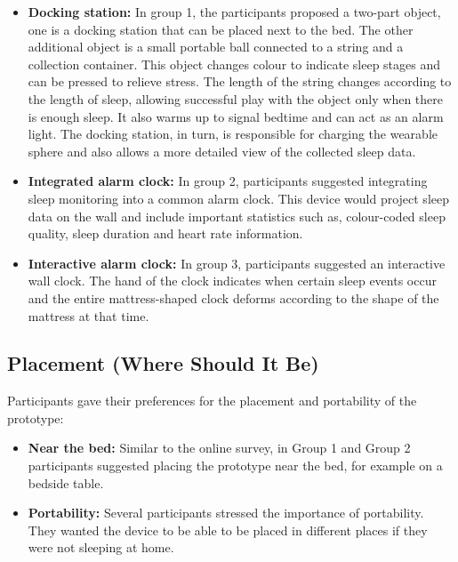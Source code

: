 \documentclass[
  a4paper,  %
  twoside,  %
  bibliography=totoc,
  headsepline,
  cleardoublepage=empty,
  parskip=half,
  draft=false
]{scrbook}
\begin{document}
\begin{itemize}
    \item \textbf{Docking station:} In group 1, the participants proposed a two-part object, one is a docking station that can be placed next to the bed. The other additional object is a small portable ball connected to a string and a collection container. This object changes colour to indicate sleep stages and can be pressed to relieve stress. The length of the string changes according to the length of sleep, allowing successful play with the object only when there is enough sleep. It also warms up to signal bedtime and can act as an alarm light. The docking station, in turn, is responsible for charging the wearable sphere and also allows a more detailed view of the collected sleep data.
    \item \textbf{Integrated alarm clock:} In group 2, participants suggested integrating sleep monitoring into a common alarm clock. This device would project sleep data on the wall and include important statistics such as, colour-coded sleep quality, sleep duration and heart rate information. 
    \item \textbf{Interactive alarm clock:} In group 3, participants suggested an interactive wall clock. The hand of the clock indicates when certain sleep events occur and the entire mattress-shaped clock deforms according to the shape of the mattress at that time.
\end{itemize}

\subsection{Placement (Where Should It Be)}
Participants gave their preferences for the placement and portability of the prototype:

\begin{itemize}
    \item \textbf{Near the bed:} Similar to the online survey, in Group 1 and Group 2 participants suggested placing the prototype near the bed, for example on a bedside table.
    \item \textbf{Portability:} Several participants stressed the importance of portability. They wanted the device to be able to be placed in different places if they were not sleeping at home.
\end{itemize}
\end{document}
